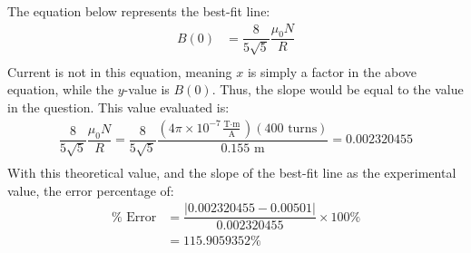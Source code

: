 \documentclass [12pt, letterpaper, twoside] {article}
\begin{document}
\begin{enumerate}
\begin{enumerate}
        The equation below represents the best-fit line:
        \begin{equation*}
          \begin{split}
            B(0) &= \dfrac{8}{5\sqrt{5}}\dfrac{\mu_{0}N}{R} \\
          \end{split}
        \end{equation*}
        Current is not in this equation, meaning \(x\) is simply a factor in the above equation, while the \(y\)-value is \(B(0)\). Thus, the slope would be equal to the value in the question. This value evaluated is:
        \begin{equation*}
          \begin{split}
            \dfrac{8}{5\sqrt{5}}\dfrac{\mu_{0}N}{R} = \dfrac{8}{5\sqrt{5}}\dfrac{(4\pi\times{10}^{-7}\tfrac{\text{T}\cdot\text{m}}{\text{A}})(400\text{ turns})}{0.155\text{ m}} = 0.002320455 \\
          \end{split}
        \end{equation*}
        With this theoretical value, and the slope of the best-fit line as the experimental value, the error percentage of:
        \begin{equation*}
          \begin{split}
            \%\text{ Error} &= \dfrac{|0.002320455 - 0.00501|}{0.002320455}\times{100\%} \\
                            &= 115.9059352\% \\
          \end{split}
        \end{equation*}
    \end{enumerate}
\end{enumerate}
\end{document}
